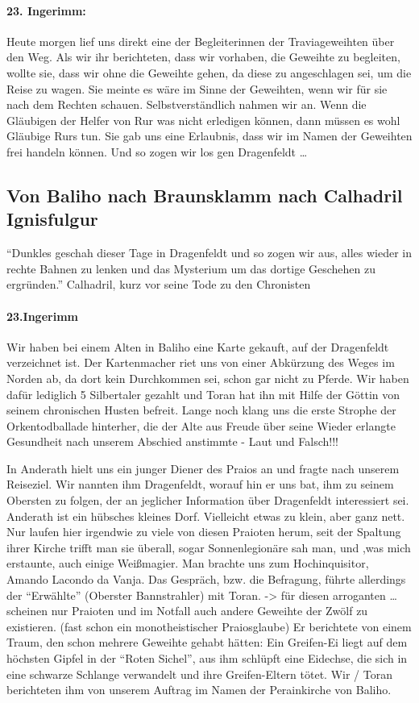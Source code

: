 \paragraph{23. Ingerimm:}
Heute morgen lief uns direkt eine der Begleiterinnen der Traviageweihten über den Weg. Als wir ihr berichteten, dass wir vorhaben, die Geweihte zu begleiten, wollte sie, dass wir ohne die Geweihte gehen, da diese zu angeschlagen sei, um die Reise zu wagen. Sie meinte es wäre im Sinne der Geweihten, wenn wir für sie nach dem Rechten schauen. Selbstverständlich nahmen wir an. Wenn die Gläubigen der Helfer von Rur was nicht erledigen können, dann müssen es wohl Gläubige Rurs tun. Sie gab uns eine Erlaubnis, dass wir im Namen der Geweihten frei handeln können. Und so zogen wir los gen Dragenfeldt \dots


\subsection{Von Baliho nach Braunsklamm nach Calhadril Ignisfulgur}
``Dunkles geschah dieser Tage in Dragenfeldt  und so zogen wir aus, alles wieder in rechte Bahnen zu lenken und das Mysterium um das dortige Geschehen zu ergründen.''
Calhadril, kurz vor seine Tode zu den Chronisten

\paragraph{23.Ingerimm}

Wir haben bei einem Alten in Baliho eine Karte gekauft, auf der Dragenfeldt  verzeichnet ist. Der Kartenmacher riet uns von einer Abkürzung des Weges im Norden ab, da dort kein Durchkommen sei, schon gar nicht zu Pferde. Wir haben dafür lediglich 5 Silbertaler gezahlt und Toran hat ihn mit Hilfe der Göttin von seinem chronischen Husten befreit. Lange noch klang uns die erste Strophe der Orkentodballade hinterher, die der Alte aus Freude über seine Wieder erlangte Gesundheit nach unserem Abschied anstimmte - Laut und Falsch!!!


In Anderath hielt uns ein junger Diener des Praios an und fragte nach unserem Reiseziel. Wir nannten ihm Dragenfeldt, worauf hin er uns bat, ihm zu seinem Obersten zu folgen, der an jeglicher Information über Dragenfeldt  interessiert sei. Anderath ist ein hübsches kleines Dorf. Vielleicht etwas zu klein, aber ganz nett. Nur laufen hier irgendwie zu viele von diesen Praioten herum, seit der Spaltung ihrer Kirche trifft man sie überall, sogar Sonnenlegionäre sah man, und ,was mich erstaunte, auch einige Weißmagier. Man brachte uns zum Hochinquisitor, Amando Lacondo da Vanja. Das Gespräch, bzw. die Befragung, führte allerdings der ``Erwählte'' (Oberster Bannstrahler) mit Toran. -> für diesen arroganten \dots scheinen nur Praioten und im Notfall auch andere Geweihte der Zwölf zu existieren. (fast schon ein monotheistischer Praiosglaube) Er berichtete von einem Traum, den schon mehrere Geweihte gehabt hätten: Ein Greifen-Ei liegt auf dem höchsten Gipfel in der ``Roten Sichel'', aus ihm schlüpft eine Eidechse, die sich in eine schwarze Schlange verwandelt und ihre Greifen-Eltern tötet. Wir / Toran berichteten ihm von unserem Auftrag im Namen der Perainkirche von Baliho. 


